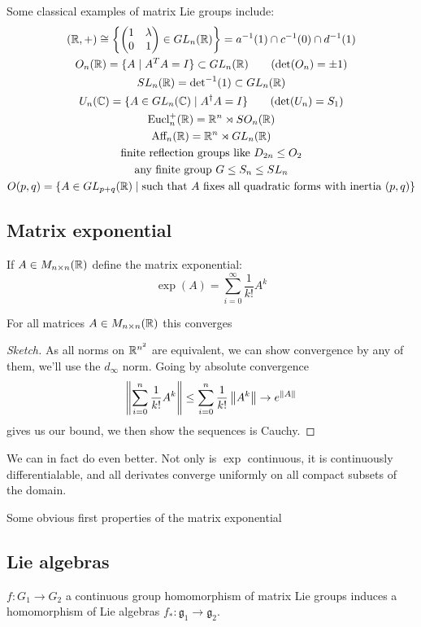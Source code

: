 \documentclass{article}
\begin{document}
Some classical examples of matrix Lie groups include: \begin{gather*}
    (\mathbb{R},+) \cong \left\{\begin{pmatrix}
        1 & \lambda \\ 0 & 1
    \end{pmatrix} \in GL_n(\mathbb{R})\right\} = a^{-1}(1) \cap c^{-1}(0) \cap d^{-1}(1)\\
    O_n(\mathbb{R}) = \{A \mid A^TA = I\} \subset GL_n(\mathbb{R}) \qquad (\det(O_n)=\pm 1)\\
    SL_n(\mathbb{R}) = {\det}^{-1}(1)\subset GL_n(\mathbb{R})\\
    U_n(\mathbb{C}) = \{A\in GL_n(\mathbb{C}) \mid A^\dagger A = I\} \qquad (\det(U_n)=S_1)\\
    \text{Eucl}_n^+(\mathbb{R}) = \mathbb{R}^n \rtimes SO_n(\mathbb{R})\\
    \text{Aff}_n(\mathbb{R}) = \mathbb{R}^n \rtimes GL_n(\mathbb{R})\\
    \text{finite reflection groups like } D_{2n}\leq O_2 \\
    \text{any finite group } G\leq S_n\leq SL_n\\
    O(p,q) = \{A\in GL_{p+q}(\mathbb{R}) \mid \text{such that $A$ fixes all quadratic forms with inertia }(p,q)\}
\end{gather*}

\subsection{Matrix exponential}

\begin{definition}
    If $A\in M_{n\times n}(\mathbb{R})$ define the matrix exponential: \[
        \exp(A) = \sum_{i=0}^\infty \frac{1}{k!}A^k
    \]
\end{definition}

\begin{proposition}
    For all matrices $A\in M_{n\times n}(\mathbb{R})$ this converges\begin{proof}[Sketch]
        As all norms on $\mathbb{R}^{n^2}$ are equivalent, we can show convergence by any of them, we'll use the $d_\infty$ norm. Going by absolute convergence \[
        \left\lVert \sum_{i=0}^n\frac{1}{k!}A^k \right\rVert \leq \sum_{i=0}^n\frac{1}{k!}\left\lVert A^k \right\rVert\rightarrow e^{\left\lVert A \right\rVert}
        \] gives us our bound, we then show the sequences is Cauchy.
    \end{proof}
\end{proposition}

\begin{theorem}
    We can in fact do even better. Not only is $\exp$ continuous, it is continuously differentialable, and all derivates converge uniformly on all compact subsets of the domain.
\end{theorem}

Some obvious first properties of the matrix exponential


\subsection{Lie algebras}

\begin{theorem}
    $f:G_1\rightarrow G_2$ a continuous group homomorphism of matrix Lie groups induces a homomorphism of Lie algebras $f_*:\mathfrak{g}_1\rightarrow\mathfrak{g}_2$.
\end{theorem}
\end{document}
